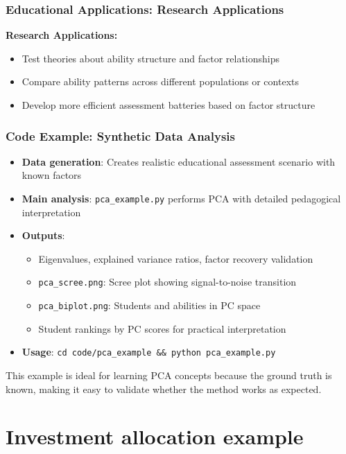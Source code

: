\documentclass[aspectratio=169]{beamer}
\begin{document}
\begin{frame}
    \frametitle{Educational Applications: Research Applications}
    \textbf{Research Applications:}
    \begin{itemize}
        \item Test theories about ability structure and factor relationships \pause
        \item Compare ability patterns across different populations or contexts \pause
        \item Develop more efficient assessment batteries based on factor structure \pause
    \end{itemize}
\end{frame}

\begin{frame}
    \frametitle{Code Example: Synthetic Data Analysis}
    \begin{itemize}
        \item \textbf{Data generation}: Creates realistic educational assessment scenario with known factors \pause
        \item \textbf{Main analysis}: \texttt{pca\_example.py} performs PCA with detailed pedagogical interpretation \pause
        \item \textbf{Outputs}:
              \begin{itemize}
                  \item Eigenvalues, explained variance ratios, factor recovery validation \pause
                  \item \texttt{pca\_scree.png}: Scree plot showing signal-to-noise transition \pause
                  \item \texttt{pca\_biplot.png}: Students and abilities in PC space \pause
                  \item Student rankings by PC scores for practical interpretation \pause
              \end{itemize}
        \item \textbf{Usage}: \texttt{cd code/pca\_example \&\& python pca\_example.py} \pause
    \end{itemize}
    \vspace{6pt}
    This example is ideal for learning PCA concepts because the ground truth is known, making it easy to validate whether the method works as expected.
\end{frame}

\section{Investment allocation example}
\end{document}
